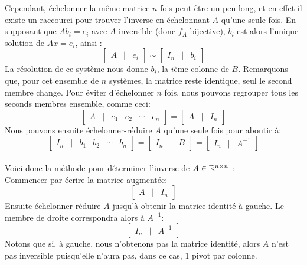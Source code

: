 \noindent Cependant, échelonner la même matrice $n$ fois peut être un peu long, et en effet il existe un raccourci pour trouver l'inverse en échelonnant $A$ qu'une seule fois. En supposant que $Ab_i = e_i$ avec $A$ inversible (donc $f_A$ bijective), $b_i$ est alors l'unique solution de $Ax = e_i$, ainsi :
$$\begin{bmatrix} A & | & e_i\end{bmatrix} \sim \begin{bmatrix} I_n & | & b_i\end{bmatrix}$$
La résolution de ce système nous donne $b_i$, la $i$ème colonne de $B$. Remarquons que, pour cet ensemble de $n$ systèmes, la matrice reste identique, seul le second membre change. Pour éviter d'échelonner $n$ fois, nous pouvons regrouper tous les seconds membres ensemble, comme ceci:
$$\begin{bmatrix} A & | & e_1 & e_2 & \cdots & e_n\end{bmatrix} = \begin{bmatrix} A & | & I_n\end{bmatrix}$$
Nous pouvons ensuite échelonner-réduire $A$ qu'une seule fois pour aboutir à:
$$\begin{bmatrix} I_n & | & b_1 & b_2 & \cdots & b_n\end{bmatrix} = \begin{bmatrix} I_n & | & B \end{bmatrix} = \begin{bmatrix} I_n & | & A^{-1} \end{bmatrix}$$ \\

\noindent Voici donc la méthode pour déterminer l'inverse de $A \in \mathbb{R}^{n \times n}$ :\\
Commencer par écrire la matrice augmentée:
$$\begin{bmatrix} A & | & I_n\end{bmatrix}$$
Ensuite échelonner-réduire $A$ jusqu'à obtenir la matrice identité à gauche. Le membre de droite correspondra alors à $A^{-1}$:
$$\begin{bmatrix} I_n & | & A^{-1}\end{bmatrix}$$
Notons que si, à gauche, nous n'obtenons pas la matrice identité, alors $A$ n'est pas inversible puisqu'elle n'aura pas, dans ce cas, 1 pivot par colonne.\\

